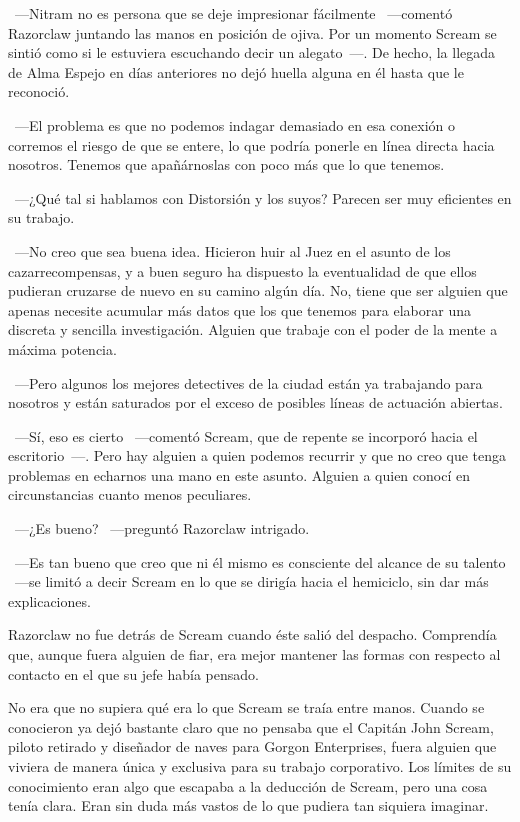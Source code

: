 ~---Nitram no es persona que se deje impresionar fácilmente ~---comentó Razorclaw juntando las manos en posición de ojiva. Por un momento Scream se sintió como si le estuviera escuchando decir un alegato~---. De hecho, la llegada de Alma Espejo en días anteriores no dejó huella alguna en él hasta que le reconoció.

~---El problema es que no podemos indagar demasiado en esa conexión o corremos el riesgo de que se entere, lo que podría ponerle en línea directa hacia nosotros. Tenemos que apañárnoslas con poco más que lo que tenemos.

~---¿Qué tal si hablamos con Distorsión y los suyos? Parecen ser muy eficientes en su trabajo.

~---No creo que sea buena idea. Hicieron huir al Juez en el asunto de los cazarrecompensas, y a buen seguro ha dispuesto la eventualidad de que ellos pudieran cruzarse de nuevo en su camino algún día. No, tiene que ser alguien que apenas necesite acumular más datos que los que tenemos para elaborar una discreta y sencilla investigación. Alguien que trabaje con el poder de la mente a máxima potencia.

~---Pero algunos los mejores detectives de la ciudad están ya trabajando para nosotros y están saturados por el exceso de posibles líneas de actuación abiertas.

~---Sí, eso es cierto ~---comentó Scream, que de repente se incorporó hacia el escritorio~---. Pero hay alguien a quien podemos recurrir y que no creo que tenga problemas en echarnos una mano en este asunto. Alguien a quien conocí en circunstancias cuanto menos peculiares.

~---¿Es bueno? ~---preguntó Razorclaw intrigado.

~---Es tan bueno que creo que ni él mismo es consciente del alcance de su talento ~---se limitó a decir Scream en lo que se dirigía hacia el hemiciclo, sin dar más explicaciones.

\parbreak
Razorclaw no fue detrás de Scream cuando éste salió del despacho. Comprendía que, aunque fuera alguien de fiar, era mejor mantener las formas con respecto al contacto en el que su jefe había pensado.

No era que no supiera qué era lo que Scream se traía entre manos. Cuando se conocieron ya dejó bastante claro que no pensaba que el Capitán John Scream, piloto retirado y diseñador de naves para Gorgon Enterprises, fuera alguien que viviera de manera única y exclusiva para su trabajo corporativo. Los límites de su conocimiento eran algo que escapaba a la deducción de Scream, pero una cosa tenía clara. Eran sin duda más vastos de lo que pudiera tan siquiera imaginar.

